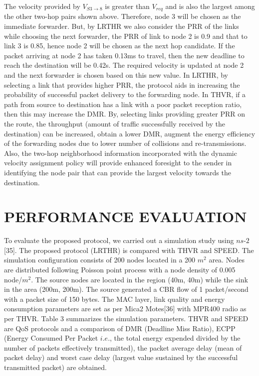\documentclass[fleqn,twoside]{article}
\begin{document}
The velocity provided by $V_{S3\rightarrow 8}$ is greater than $V_{req}$ and is also the largest among the other two-hop pairs shown
above. Therefore, node 3 will be chosen as the immediate forwarder. But, by LRTHR we also consider the PRR of the links while
choosing the next forwarder, the PRR of link to node 2 is 0.9 and that to link 3 is 0.85, hence node 2 will be chosen 
as the next hop candidate. If the packet arriving at node 2 has taken 0.13ms to travel, then the new deadline to
reach the destination will be 0.42s. The required velocity is updated at node 2 and the next forwarder is 
chosen based on this new value.
\vskip 2mm
In LRTHR, by selecting a link that provides higher PRR, the protocol aids in increasing the probability of successful 
packet delivery to the forwarding node. In THVR, if a path from source to destination has a link with a poor packet
reception ratio, then this may increase the DMR. By, selecting links providing greater PRR on the route, the throughput
(amount of traffic successfully received by the destination) can be increased, obtain a lower DMR, augment the energy
efficiency of the forwarding nodes due to lower number of collisions and re-transmissions. Also, the two-hop neighborhood
information incorporated with the dynamic velocity assignment policy will provide enhanced foresight to the sender in 
identifying the node pair that can provide the largest velocity towards the destination.
 \section{PERFORMANCE EVALUATION}

To evaluate the proposed protocol, we carried out a simulation study using $ns$-$2$[35]. The proposed 
protocol (LRTHR) is compared with THVR and SPEED. The simulation configuration consists of 200 nodes 
located in a 200 $m^2$ area. Nodes are distributed following Poisson point process with a node density of 0.005 node/$m^2$. The 
source nodes are located in the region (40m, 40m) while the sink in the area (200m, 200m). The source generated a CBR 
flow of 1 packet/second with a packet size of 150 bytes. 
\vskip 2mm
The MAC layer, link quality and energy consumption parameters are
set as per Mica2 Motes[36] with MPR400 radio as per THVR. Table 3 summarizes the simulation parameters.
THVR and SPEED are QoS protocols and a comparison of DMR (Deadline Miss Ratio), ECPP (Energy Consumed Per Packet $i.e.$, the total
energy expended divided by the number of packets effectively transmitted), the packet average delay (mean of packet delay) and 
worst case delay (largest value sustained by the successful transmitted packet) are obtained.
\end{document}
